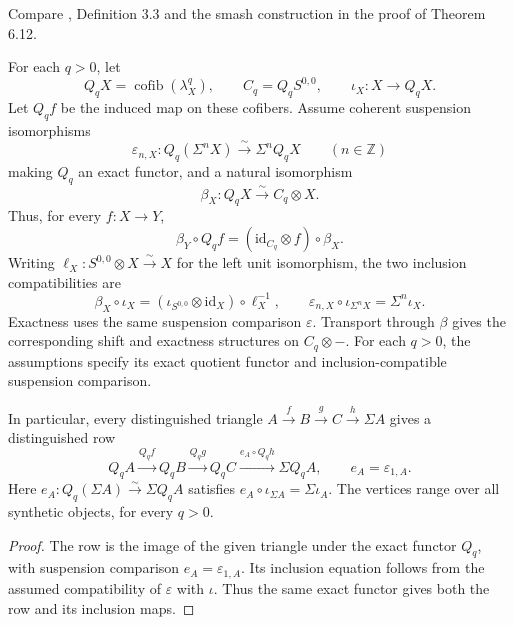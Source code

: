 \begin{definition}
\label{sem:Literature:finite-quotient-comparison}
\label{sem:Literature:finite-quotient-horizontal-row}
Compare \cite{LWX126}, Definition 3.3 and the smash construction in the
proof of Theorem 6.12.\par

For each $q>0$, let
\[
Q_qX=\operatorname{cofib}(\lambda_X^q),\qquad
C_q=Q_qS^{0,0},\qquad \iota_X:X\longrightarrow Q_qX.
\]
Let $Q_qf$ be the induced map on these cofibers. Assume coherent
suspension isomorphisms
\[
\varepsilon_{n,X}:Q_q(\Sigma^nX)\xrightarrow{\sim}\Sigma^nQ_qX
\qquad(n\in\mathbb Z)
\]
making $Q_q$ an exact functor, and a natural isomorphism
\[
\beta_X:Q_qX\xrightarrow{\sim}C_q\otimes X.
\]
Thus, for every $f:X\to Y$,
\[
\beta_Y\circ Q_qf=(\mathrm{id}_{C_q}\otimes f)\circ\beta_X.
\]
Writing $\ell_X:S^{0,0}\otimes X\xrightarrow{\sim}X$ for the left
unit isomorphism, the two inclusion compatibilities are
\[
\beta_X\circ\iota_X
  =(\iota_{S^{0,0}}\otimes\mathrm{id}_X)\circ\ell_X^{-1},
\qquad
\varepsilon_{n,X}\circ\iota_{\Sigma^nX}=\Sigma^n\iota_X.
\]
Exactness uses the same suspension comparison $\varepsilon$.
Transport through $\beta$ gives the corresponding shift and exactness
structures on $C_q\otimes-$.
For each $q>0$, the assumptions specify its exact quotient functor
and inclusion-compatible suspension comparison.

In particular, every distinguished triangle
$A\xrightarrow fB\xrightarrow gC\xrightarrow h\Sigma A$ gives a
distinguished row
\[
 Q_qA\xrightarrow{Q_qf}Q_qB\xrightarrow{Q_qg}Q_qC
 \xrightarrow{e_A\circ Q_qh}\Sigma Q_qA,
 \qquad e_A=\varepsilon_{1,A}.
\]
Here $e_A:Q_q(\Sigma A)\xrightarrow{\sim}\Sigma Q_qA$ satisfies
$e_A\circ\iota_{\Sigma A}=\Sigma\iota_A$. The vertices range over all
synthetic objects, for every $q>0$.

\end{definition}
\begin{proof}
The row is the image of the given triangle under the exact functor
$Q_q$, with suspension comparison $e_A=\varepsilon_{1,A}$.
Its inclusion equation follows from the assumed compatibility of
$\varepsilon$ with $\iota$. Thus the same exact functor gives both
the row and its inclusion maps.
\end{proof}

